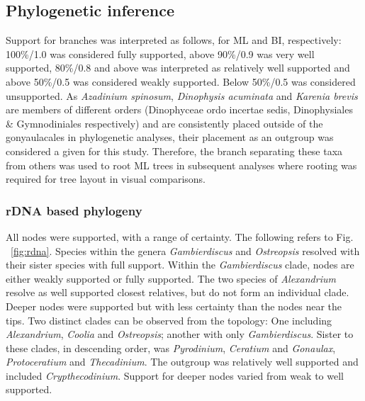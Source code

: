 \documentclass[fleqn,10pt,lineno]{wlpeerj} %
\begin{document}
\subsection*{Phylogenetic inference}
Support for branches was interpreted as follows, for ML and BI, respectively: 100\%/1.0 was considered fully supported, above 90\%/0.9 was very well supported, 80\%/0.8 and above was interpreted as relatively well supported and above 50\%/0.5 was considered weakly supported. Below 50\%/0.5 was considered unsupported.
As \emph{Azadinium spinosum}, \emph{Dinophysis acuminata} and \emph{Karenia brevis} are members of different orders (Dinophyceae ordo incertae sedis, Dinophysiales \& Gymnodiniales respectively) and are consistently placed outside of the gonyaulacales in phylogenetic analyses, their placement as an outgroup was considered a given for this study. 
Therefore, the branch separating these taxa from others was used to root ML trees in subsequent analyses where rooting was required for tree layout in visual comparisons.
\subsubsection*{rDNA based phylogeny}
All nodes were supported, with a range of certainty.
The following refers to Fig. ~\ref{fig:rdna}.
Species within the genera \emph{Gambierdiscus} and \emph{Ostreopsis} resolved with their sister species with full support. 
Within the \emph{Gambierdiscus} clade, nodes are either weakly supported or fully supported. 
The two species of \emph{Alexandrium} resolve as well supported closest relatives, but do not form an individual clade. 
Deeper nodes were supported but with less certainty than the nodes near the tips. 
Two distinct clades can be observed from the topology: One including \emph{Alexandrium}, \emph{Coolia} and \emph{Ostreopsis}; another with only \emph{Gambierdiscus}. 
Sister to these clades, in descending order, was \emph{Pyrodinium}, \emph{Ceratium} and \emph{Gonaulax}, \emph{Protoceratium} and \emph{Thecadinium}. 
The outgroup was relatively well supported and included \emph{Crypthecodinium}. 
Support for deeper nodes varied from weak to well supported.
\end{document}
